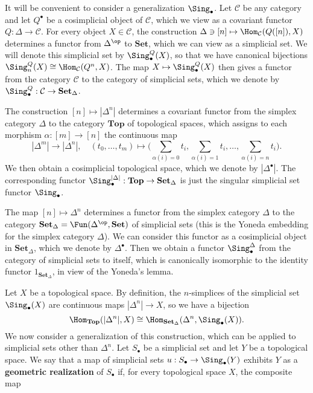 It will be convenient to consider a generalization $\Sing_\bullet$. Let $\mathcal{C}$ be any category and let $Q^\bullet$ be a cosimplicial object of $\mathcal{C}$, which we view as a covariant functor $Q:\Delta\to\mathcal{C}$. For every object $X\in\mathcal{C}$, the construction $\Delta\ni[n]\mapsto\Hom_{\mathcal{C}}(Q([n]),X)$ determines a functor from $\Delta^{\op}$ to $\mathbf{Set}$, which we can view as a simplicial set. We will denote this simplicial set by $\Sing_\bullet^Q(X)$, so that we have canonical bijections $\Sing_n^Q(X)\cong\Hom_{\mathcal{C}}(Q^n,X)$. The map $X\mapsto\Sing_\bullet^Q(X)$ then gives a functor from the category $\mathcal{C}$ to the category of simplicial sets, which we denote by $\Sing_\bullet^Q:\mathcal{C}\to\mathbf{Set}_\Delta$.\par
\begin{example}
The construction $[n]\mapsto|\Delta^n|$ determines a covariant functor from the simplex category $\Delta$ to the category $\mathbf{Top}$ of topological spaces, which assigns to each morphism $\alpha:[m]\to[n]$ the continuous map
\[|\Delta^m|\to|\Delta^n|,\quad (t_0,\dots,t_m)\mapsto\Big(\sum_{\alpha(i)=0}t_i,\sum_{\alpha(i)=1}t_i,\dots,\sum_{\alpha(i)=n}t_i\Big).\]
We then obtain a cosimplicial topological space, which we denote by $|\Delta^\bullet|$. The corresponding functor $\Sing_\bullet^{|\Delta|}:\mathbf{Top}\to\mathbf{Set}_\Delta$ is just the singular simplicial set functor $\Sing_\bullet$.
\end{example}
\begin{example}
The map $[n]\mapsto\Delta^n$ determines a functor from the simplex category $\Delta$ to the category $\mathbf{Set}_\Delta=\Fun(\Delta^{\op},\mathbf{Set})$ of simplicial sets (this is the Yoneda embedding for the simplex category $\Delta$). We can consider this functor as a cosimplicial object in $\mathbf{Set}_\Delta$, which we denote by $\Delta^\bullet$. Then we obtain a functor $\Sing_\bullet^{\Delta}$ from the category of simplicial sets to itself, which is canonically isomorphic to the identity functor $1_{\mathbf{Set}_\Delta}$, in view of the Yoneda's lemma.
\end{example}
Let $X$  be a topological space. By definition, the $n$-simplices of the simplicial set $\Sing_\bullet(X)$ are continuous maps $|\Delta^n|\to X$, so we have a bijection
\[\Hom_{\mathbf{Top}}(|\Delta^n|,X)\cong\Hom_{\mathbf{Set}_\Delta}(\Delta^n,\Sing_\bullet(X)).\]
We now consider a generalization of this construction, which can be applied to simplicial sets other than $\Delta^n$. Let $S_\bullet$ be a simplicial set and let $Y$ be a topological space. We say that a map of simplicial sets $u:S_\bullet\to\Sing_\bullet(Y)$ exhibits $Y$ as a \textbf{geometric realization} of $S_\bullet$ if, for every topological space $X$, the composite map
